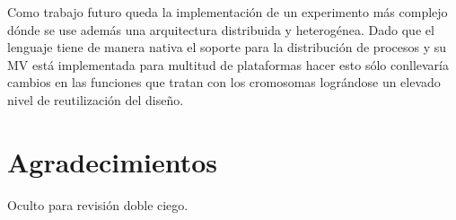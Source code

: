 \documentclass[runningheads]{llncs}
\begin{document}
Como trabajo futuro queda la implementación de un experimento más
complejo dónde se use además una arquitectura distribuida y
heterogénea. Dado que el lenguaje tiene de manera nativa el soporte
para la distribución de procesos y su MV está implementada para
multitud de plataformas hacer esto sólo conllevaría cambios en las
funciones que tratan con los cromosomas lográndose un elevado nivel de
reutilización del diseño. 

\section{Agradecimientos}

Oculto para revisión doble ciego.



\end{document}
